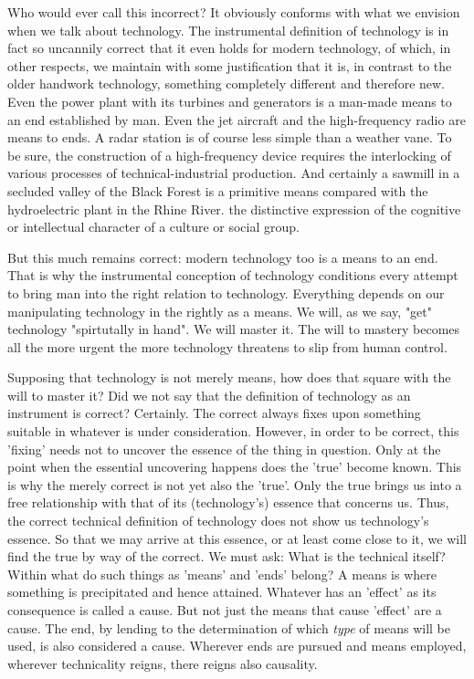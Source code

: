 Who would ever call this incorrect? It obviously conforms with what we envision when we talk about technology. The instrumental definition of technology is in fact so uncannily correct that it even holds for modern technology, of which, in other respects, we maintain with some justification that it is, in contrast to the older handwork technology, something completely different and therefore new. Even the power plant with its turbines and generators is a man-made means to an end established by man. Even the jet aircraft and the high-frequency radio are means to ends. A radar station is of course less simple than a weather vane. To be sure, the construction of a high-frequency device requires the interlocking of various processes of technical-industrial production. And certainly a sawmill in a secluded valley of the Black Forest is a primitive means compared with the hydroelectric plant in the Rhine River.
the distinctive expression of the cognitive or intellectual character of a culture or social group.

But this much remains correct: modern technology too is a means to an end. That is why the instrumental conception of technology conditions every attempt to bring man into the right relation to technology. Everything depends on our manipulating technology in the rightly as a means. We will, as we say, "get" technology "spirtutally in hand". We will master it. The will to mastery becomes all the more urgent the more technology threatens to slip from human control.

Supposing that technology is not merely means, how does that square with the will to master it? Did we not say that the definition of technology as an instrument is correct? Certainly. The correct always fixes upon something suitable in whatever is under consideration. However, in order to be correct, this 'fixing' needs not to uncover the essence of the thing in question. Only at the point when the essential uncovering happens does the 'true' become known. This is why the merely correct is not yet also the 'true'. Only the true brings us into a free relationship with that of its (technology's) essence that concerns us. Thus, the correct technical definition of technology does not show us technology's essence. So that we may arrive at this essence, or at least come close to it, we will find the true by way of the correct. We must ask: What is the technical itself? Within what do such things as 'means' and 'ends' belong? A means is where something is precipitated and hence attained. Whatever has an 'effect' as its consequence is called a cause. But not just the means that cause 'effect' are a cause. The end, by lending to the determination of which \textit{type} of means will be used, is also considered a cause. Wherever ends are pursued and means employed, wherever technicality reigns, there reigns also causality.

